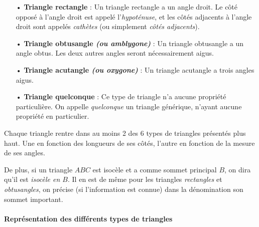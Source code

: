 \documentclass[a4paper, twoside]{article}
\begin{document}
\begin{itemize}
	      \medbreak\medbreak\medbreak

	\item[•] \textbf{Triangle rectangle} : Un triangle rectangle a un angle droit.
	      Le côté opposé à l'angle droit est appelé l'\emph{hypoténuse},
	      et les côtés adjacents à l'angle droit sont appelés \emph{cathètes} (ou simplement \textit{côtés adjacents}).
		  \medbreak
    \item[•] \textbf{Triangle obtusangle \textit{(ou amblygone)}} : Un triangle obtusangle a un angle obtus.
	      Les deux autres angles seront nécessairement aigus.
		  \medbreak
	\item[•] \textbf{Triangle acutangle \textit{(ou oxygone)}} : Un triangle acutangle a trois angles aigus.

	\medbreak\medbreak\medbreak

	\item[•] \textbf{Triangle quelconque} : Ce type de triangle n'a aucune propriété particulière. 
	On appelle \textit{quelconque} un triangle générique, n'ayant aucune propriété en particulier. 
\end{itemize}

\bigbreak

Chaque triangle rentre dans au moins 2 des 6 types de triangles présentés plus haut.
Une en fonction des longueurs de ses côtés, l'autre en fonction de la mesure de ses angles.

De plus, si un triangle $ABC$ est isocèle et a comme sommet principal $B$, on dira qu'il est \textit{isocèle en $B$}.
Il en est de même pour les triangles \textit{rectangles} et \textit{obtusangles}, 
on précise (si l'information est connue) dans la dénomination son sommet important.

\paragraph*{Représentation des différents types de triangles}
\end{document}
